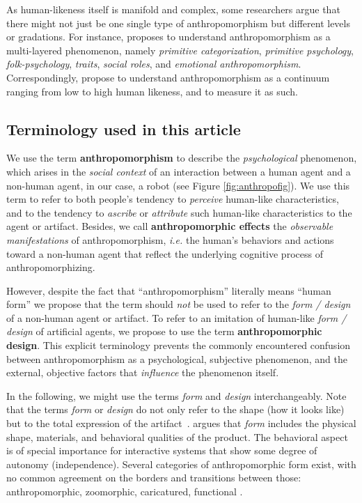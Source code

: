 \documentclass{frontiersSCNS} %
\newcommand{\ie}{\textit{i.e.}\xspace}
\begin{document}
As human-likeness itself is manifold and complex,
some researchers argue that there might not just be one single type of
anthropomorphism but different levels or gradations. For instance,
\citet{persson_anthropomorphism_2000} proposes to understand anthropomorphism as
a multi-layered phenomenon, namely \emph{primitive categorization},
\emph{primitive psychology}, \emph{folk-psychology}, \emph{traits}, \emph{social
roles}, and \emph{emotional anthropomorphism}. Correspondingly,
\citet{ruijten_introducing_2014} propose to understand anthropomorphism as a
continuum ranging from low to high human likeness, and to measure it as such.


\subsection{Terminology used in this article}

We use the term \textbf{anthropomorphism} to describe the \emph{psychological}
phenomenon, which arises in the \emph{social context} of an interaction between
a human agent and a non-human agent, in our case, a robot (see Figure
\ref{fig:anthropofig}). We use this term to refer to both people's tendency to
\textit{perceive} human-like characteristics, and to the tendency to
\textit{ascribe} or \textit{attribute} such human-like characteristics to the
agent or artifact. Besides, we call {\bf anthropomorphic effects} the
\emph{observable manifestations} of anthropomorphism, \ie the human's behaviors
and actions toward a non-human agent that reflect the underlying cognitive
process of anthropomorphizing.

However, despite the fact that ``anthropomorphism'' literally means ``human
form'' we propose that the term should \textit{not} be used to refer to the
\textit{form / design} of a non-human agent or artifact. To refer to an
imitation of human-like \textit{form / design} of artificial agents, we propose
to use the term \textbf{anthropomorphic design}. This explicit terminology
prevents the commonly encountered confusion between anthropomorphism as a
psychological, subjective phenomenon, and the external, objective factors that
\emph{influence} the phenomenon itself.

In the following, we might use the terms \emph{form} and \emph{design}
interchangeably. Note that the terms \textit{form} or {\it design} do not only
refer to the shape (how it looks like) but to the total expression of the
artifact~\citep{bartneck_shaping_2004}. \citet{disalvo_hug:_2003} argues that
\textit{form} includes the physical shape, materials, and behavioral qualities
of the product. The behavioral aspect is of special importance for interactive
systems that show some degree of autonomy (independence).  Several categories of
anthropomorphic form exist, with no common agreement on the borders and
transitions between those: anthropomorphic, zoomorphic, caricatured, functional
\citep{fong_survey_2003}.
\end{document}

